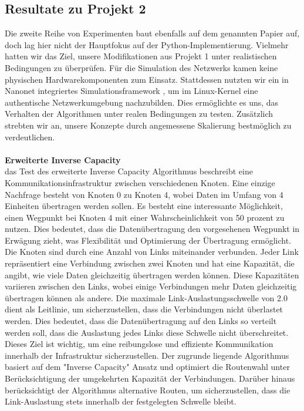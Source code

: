 \documentclass[sigconf, nonacm, review]{acmart}
\begin{document}
\subsection{Resultate zu Projekt 2}
Die zweite Reihe von Experimenten baut ebenfalls auf dem genannten Papier auf, doch lag hier nicht der Hauptfokus auf der Python-Implementierung. Vielmehr hatten wir das Ziel, unsere Modifikationen aus Projekt 1 unter realistischen Bedingungen zu überprüfen. Für die Simulation des Netzwerks kamen keine physischen Hardwarekomponenten zum Einsatz. Stattdessen nutzten wir ein in Nanonet integriertes Simulationsframework \cite{nanonet} \cite{nikolaussuess-nanonet}, um im Linux-Kernel eine authentische Netzwerkumgebung nachzubilden. Dies ermöglichte es uns, das Verhalten der Algorithmen unter realen Bedingungen zu testen. Zusätzlich strebten wir an, unsere Konzepte durch angemessene Skalierung bestmöglich zu verdeutlichen.\\
\\
\textbf{ Erweiterte Inverse Capacity} \\
das Test des erweiterte Inverse Capacity Algorithmus beschreibt eine Kommunikationsinfrastruktur zwischen verschiedenen Knoten. Eine einzige Nachfrage besteht von Knoten 0 zu Knoten 4, wobei Daten im Umfang von 4 Einheiten übertragen werden sollen. Es besteht eine interessante Möglichkeit, einen Wegpunkt bei Knoten 4 mit einer Wahrscheinlichkeit von 50 prozent zu nutzen. Dies bedeutet, dass die Datenübertragung den vorgesehenen Wegpunkt in Erwägung zieht, was Flexibilität und Optimierung der Übertragung ermöglicht.
Die Knoten sind durch eine Anzahl von Links miteinander verbunden. Jeder Link repräsentiert eine Verbindung zwischen zwei Knoten und hat eine Kapazität, die angibt, wie viele Daten gleichzeitig übertragen werden können. Diese Kapazitäten variieren zwischen den Links, wobei einige Verbindungen mehr Daten gleichzeitig übertragen können als andere.
Die maximale Link-Auslastungsschwelle von 2.0 dient als Leitlinie, um sicherzustellen, dass die Verbindungen nicht überlastet werden. Dies bedeutet, dass die Datenübertragung auf den Links so verteilt werden soll, dass die Auslastung jedes Links diese Schwelle nicht überschreitet. Dieses Ziel ist wichtig, um eine reibungslose und effiziente Kommunikation innerhalb der Infrastruktur sicherzustellen.
Der zugrunde liegende Algorithmus basiert auf dem "Inverse Capacity" Ansatz und optimiert die Routenwahl unter Berücksichtigung der umgekehrten Kapazität der Verbindungen. Darüber hinaus berücksichtigt der Algorithmus alternative Routen, um sicherzustellen, dass die Link-Auslastung stets innerhalb der festgelegten Schwelle bleibt.
\end{document}
